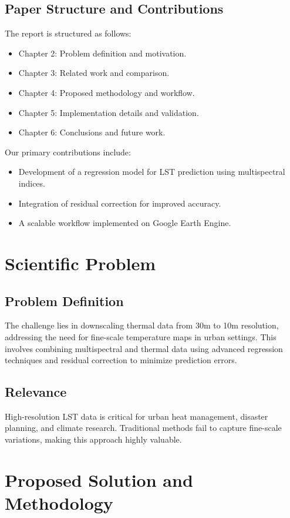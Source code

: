\documentclass[runningheads,a4paper,11pt]{report}
\begin{document}
\section{Paper Structure and Contributions}
The report is structured as follows:
\begin{itemize}
    \item Chapter 2: Problem definition and motivation.
    \item Chapter 3: Related work and comparison.
    \item Chapter 4: Proposed methodology and workflow.
    \item Chapter 5: Implementation details and validation.
    \item Chapter 6: Conclusions and future work.
\end{itemize}
Our primary contributions include:
\begin{itemize}
    \item Development of a regression model for LST prediction using multispectral indices.
    \item Integration of residual correction for improved accuracy.
    \item A scalable workflow implemented on Google Earth Engine.
\end{itemize}

\chapter{Scientific Problem}
\section{Problem Definition}
The challenge lies in downscaling thermal data from 30m to 10m resolution, addressing the need for fine-scale temperature maps in urban settings. This involves combining multispectral and thermal data using advanced regression techniques and residual correction to minimize prediction errors.

\section{Relevance}
High-resolution LST data is critical for urban heat management, disaster planning, and climate research. Traditional methods fail to capture fine-scale variations, making this approach highly valuable.

\chapter{Proposed Solution and Methodology}
\end{document}
